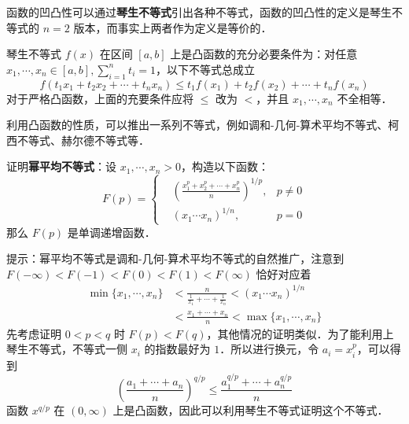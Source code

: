 函数的凹凸性可以通过\textbf{琴生不等式}引出各种不等式，函数的凹凸性的定义是琴生不等式的 $n=2$ 版本，而事实上两者作为定义是等价的．
\begin{theorem}{琴生不等式}
$f(x)$ 在区间 $[a,b]$ 上是凸函数的充分必要条件为：对任意 $x_1,\cdots,x_n\in [a,b],\sum_{i=1}^n t_i=1$，以下不等式总成立
\begin{equation}
f(t_1x_1+t_2x_2+\cdots+t_nx_n)\le t_1f(x_1)+t_2f(x_2)+\cdots+t_nf(x_n)
\end{equation}
对于严格凸函数，上面的充要条件应将 $\le$ 改为 $<$，并且 $x_1,\cdots,x_n$ 不全相等．
\end{theorem}
利用凸函数的性质，可以推出一系列不等式，例如调和-几何-算术平均不等式、柯西不等式、赫尔德不等式等．
\begin{exercise}{}
证明\textbf{幂平均不等式}：设 $x_1,\cdots,x_n>0$，构造以下函数：
\begin{equation}
F(p)=\left\{
\begin{aligned}
&\left(\frac{x_1^p+x_2^p+\cdots+x_n^p}{n}\right)^{1/p}, &p\neq 0\\
&(x_1\cdots x_n)^{1/n}, &p=0
\end{aligned}
\right.
\end{equation}
那么 $F(p)$ 是单调递增函数．
\end{exercise}
提示：幂平均不等式是调和-几何-算术平均不等式的自然推广，注意到 $F(-\infty)<F(-1)<F(0)<F(1)<F(\infty)$ 恰好对应着
\begin{equation}
\begin{aligned}
\min\{x_1,\cdots,x_n\}&<\frac{n}{\frac{1}{x_1}+\cdots+\frac{1}{x_n}}<(x_1\cdots x_n)^{1/n}\\
&<\frac{x_1+\cdots+x_n}{n}<\max\{x_1,\cdots,x_n\}
\end{aligned}
\end{equation}
先考虑证明 $0<p<q$ 时 $F(p)<F(q)$，其他情况的证明类似．为了能利用上琴生不等式，不等式一侧 $x_i$ 的指数最好为 $1$．所以进行换元，令 $a_i=x_i^p$，可以得到
\begin{equation}
\left(\frac{a_1+\cdots+a_n}{n}\right)^{q/p}\le \frac{a_1^{q/p}+\cdots+a_n^{q/p}}{n}
\end{equation}
函数 $x^{q/p}$ 在 $(0,\infty)$ 上是凸函数，因此可以利用琴生不等式证明这个不等式．

